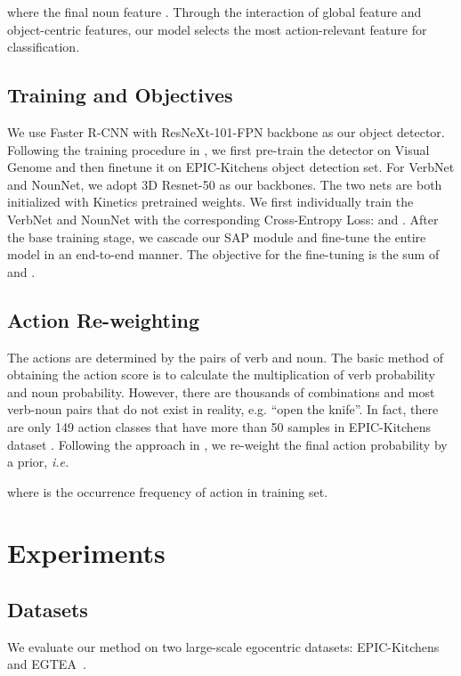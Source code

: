\documentclass[letterpaper]{article} \usepackage{aaai20}  \usepackage{times}  \usepackage{helvet} \usepackage{courier}  \usepackage[hyphens]{url}  \usepackage{graphicx} \urlstyle{rm} \def\UrlFont{\rm}  \usepackage{graphicx}  \frenchspacing  \setlength{\pdfpagewidth}{8.5in}  \setlength{\pdfpageheight}{11in}  \usepackage{amsfonts,amssymb}
\begin{document}
where the final noun feature .
Through the interaction of global feature and object-centric features, our model selects the most action-relevant feature for classification.

\subsection{Training and Objectives}
We use Faster R-CNN with ResNeXt-101-FPN backbone as our object detector. Following the training procedure in \cite{Wu2018LongTermFB},
we first pre-train the detector on Visual Genome and then finetune it on EPIC-Kitchens object detection set. For VerbNet and NounNet, we adopt 3D Resnet-50 \cite{Hara2018CanS3} as our backbones. The two nets are both initialized with Kinetics pretrained weights. We first individually train the VerbNet and NounNet with the corresponding Cross-Entropy Loss:  and . After the base training stage, we cascade our SAP module and fine-tune the entire model in an end-to-end manner. The objective for the fine-tuning is the sum of  and .


\subsection{Action Re-weighting}

The actions are determined by the pairs of verb and noun. 
The basic method of obtaining the action score is to calculate the multiplication of verb probability and noun probability. 
However, there are thousands of combinations and most verb-noun pairs that do not exist in reality, e.g. ``open the knife''. In fact, there are only 149 action classes that have more than 50 samples in EPIC-Kitchens dataset \cite{Damen2018ScalingEV}. 
Following the approach in \cite{Wu2018LongTermFB}, we 
re-weight the final action probability by a prior, \textit{i.e.}

where  is the occurrence frequency of action in training set.



\section{Experiments}

\subsection{Datasets}
We evaluate our method on two large-scale egocentric datasets: EPIC-Kitchens~\cite{Damen2018ScalingEV} and EGTEA~\cite{li2018eye}.
\end{document}
